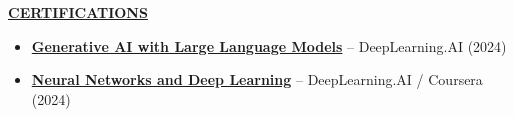 \documentclass[a4paper,11pt]{article}
\newcommand{\BlackBold}[1]{\textbf{#1}}
\newcommand{\SectionHeader}[1]{%
  \vspace{2mm}%
  \begin{center}
    {\large\textbf{\underline{#1}}}%
  \end{center}
  \vspace{-2mm}%
}
\begin{document}
\SectionHeader{CERTIFICATIONS}
{\normalsize
\begin{itemize}
  \item \href{https://coursera.org/share/66820de848d0b272fa5bef8239e27c54}{\BlackBold{Generative AI with Large Language Models}} -- DeepLearning.AI (2024)
  \item \href{https://coursera.org/share/f7c868b141a2761a5a0d7bc1da42d67d}{\BlackBold{Neural Networks and Deep Learning}} -- DeepLearning.AI / Coursera (2024)
\end{itemize}
}
\end{document}

